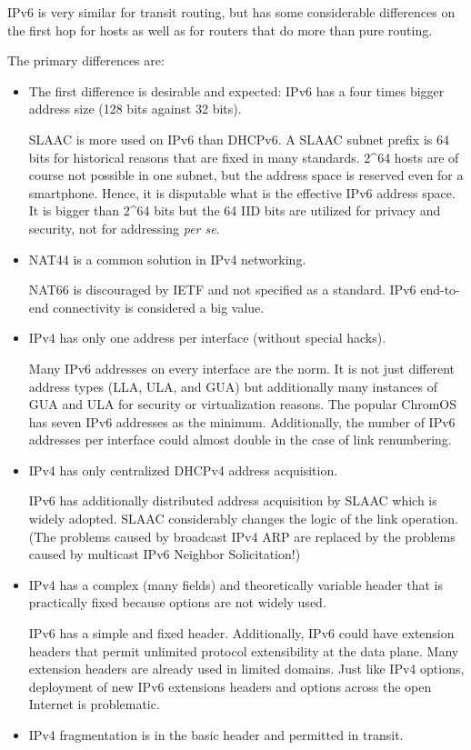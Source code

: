 \documentclass[
]{article}
\begin{document}
IPv6 is very similar for transit routing, but has some considerable
differences on the first hop for hosts as well as for routers that do
more than pure routing.

The primary differences are:

\begin{itemize}
\item
  The first difference is desirable and expected: IPv6 has a four times
  bigger address size (128 bits against 32 bits).

  SLAAC is more used on IPv6 than DHCPv6. A SLAAC subnet prefix is 64
  bits for historical reasons that are fixed in many standards. 2\^{}64
  hosts are of course not possible in one subnet, but the address space
  is reserved even for a smartphone. Hence, it is disputable what is the
  effective IPv6 address space. It is bigger than 2\^{}64 bits but the
  64 IID bits are utilized for privacy and security, not for addressing
  \emph{per se}.
\item
  NAT44 is a common solution in IPv4 networking.

  NAT66 is discouraged by IETF and not specified as a standard. IPv6
  end-to-end connectivity is considered a big value.
\item
  IPv4 has only one address per interface (without special hacks).

  Many IPv6 addresses on every interface are the norm. It is not just
  different address types (LLA, ULA, and GUA) but additionally many
  instances of GUA and ULA for security or virtualization reasons. The
  popular ChromOS has seven IPv6 addresses as the minimum. Additionally,
  the number of IPv6 addresses per interface could almost double in the
  case of link renumbering.
\item
  IPv4 has only centralized DHCPv4 address acquisition.

  IPv6 has additionally distributed address acquisition by SLAAC which
  is widely adopted. SLAAC considerably changes the logic of the link
  operation. (The problems caused by broadcast IPv4 ARP are replaced by
  the problems caused by multicast IPv6 Neighbor Solicitation!)
\item
  IPv4 has a complex (many fields) and theoretically variable header
  that is practically fixed because options are not widely used.

  IPv6 has a simple and fixed header. Additionally, IPv6 could have
  extension headers that permit unlimited protocol extensibility at the
  data plane. Many extension headers are already used in limited
  domains. Just like IPv4 options, deployment of new IPv6 extensions
  headers and options across the open Internet is problematic.
\item
  IPv4 fragmentation is in the basic header and permitted in transit.


\end{itemize}
\end{document}
